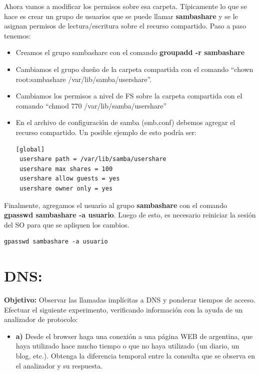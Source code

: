 \documentclass[12pt]{extarticle}
\providecommand{\tightlist}{%
      \setlength{\itemsep}{0pt}\setlength{\parskip}{0pt}}
\begin{document}
Ahora vamos a modificar los permisos sobre esa carpeta. Típicamente lo
que se hace es crear un grupo de usuarios que se puede llamar
\textbf{sambashare} y se le asignan permisos de lectura/escritura sobre
el recurso compartido. Paso a paso tenemos:

\begin{itemize}
\item
  Creamos el grupo sambashare con el comando \textbf{groupadd -r
  sambashare}
\item
  Cambiamos el grupo dueño de la carpeta compartida con el comando
  ``chown root:sambashare /var/lib/samba/usershare''.
\item
  Cambiamos los permisos a nivel de FS sobre la carpeta compartida con
  el comando ``chmod 770 /var/lib/samba/usershare''
\item
  En el archivo de configuración de samba (smb.conf) debemos agregar el
  recurso compartido. Un posible ejemplo de esto podría ser:

\begin{verbatim}
[global]
 usershare path = /var/lib/samba/usershare
 usershare max shares = 100
 usershare allow guests = yes
 usershare owner only = yes
\end{verbatim}
\end{itemize}

Finalmente, agregamos el usuario al grupo \textbf{sambashare} con el
comando \textbf{gpasswd sambashare -a usuario}. Luego de esto, es
necesario reiniciar la sesión del SO para que se apliquen los cambios.

\begin{verbatim}
gpasswd sambashare -a usuario
\end{verbatim}

    \section{DNS:}\label{dns}

\textbf{Objetivo:} Observar las llamadas implícitas a DNS y ponderar
tiempos de acceso. Efectuar el siguiente experimento, verificando
información con la ayuda de un analizador de protocolo:

\begin{itemize}
\tightlist
\item
  \textbf{a)} Desde el browser haga una conexión a una página WEB de
  argentina, que haya utilizado hace mucho tiempo o que no haya
  utilizado (un diario, un blog, etc.). Obtenga la diferencia temporal
  entre la consulta que se observa en el analizador y su respuesta.
\end{itemize}
\end{document}
